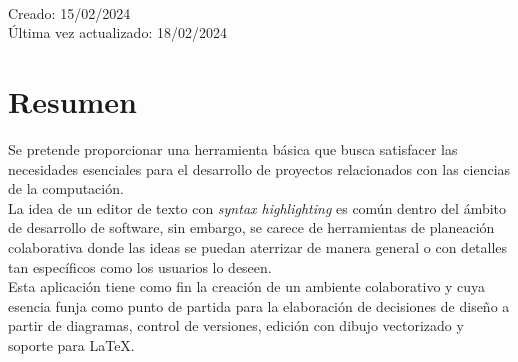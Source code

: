 \documentclass[a4paper, oneside, final]{scrartcl}
\begin{document}
\begin{center}
  {\fontsize{10}{10}\selectfont\scshape{}}\\
  {\fontsize{10}{10}\selectfont\scshape{}}\\
  \vspace{1cm}
  {\fontsize{9}{9}\selectfont\scshape{}}\\
  \vspace{0.2cm}
  {\fontsize{7}{7}\selectfont\scshape{}}\\
  {\fontsize{7}{7}\selectfont\scshape{}}\\
  {\fontsize{7}{7}\selectfont\scshape{}}\\
  {\fontsize{7}{7}\selectfont\scshape{}}\\
  {\fontsize{7}{7}\selectfont\scshape{}}\\
\end{center}
\vspace{2cm}

\begin{flushright}
  \footnotesize{Creado: 15/02/2024}\\
  \footnotesize{Última vez actualizado: 18/02/2024}\\
\end{flushright}

\section{Resumen}

Se pretende proporcionar una herramienta básica que busca satisfacer las
necesidades esenciales para el desarrollo de proyectos relacionados con las
ciencias de la computación.\\

La idea de un editor de texto con \textit{syntax highlighting} es común dentro
del ámbito de desarrollo de software, sin embargo, se carece de herramientas de
planeación colaborativa donde las ideas se puedan aterrizar de manera general o
con detalles tan específicos como los usuarios lo deseen.\\

Esta aplicación tiene como fin la creación de un ambiente colaborativo y cuya
esencia funja como punto de partida para la elaboración de decisiones de diseño
a partir de diagramas, control de versiones, edición con dibujo vectorizado y
soporte para \LaTeX.
\end{document}
